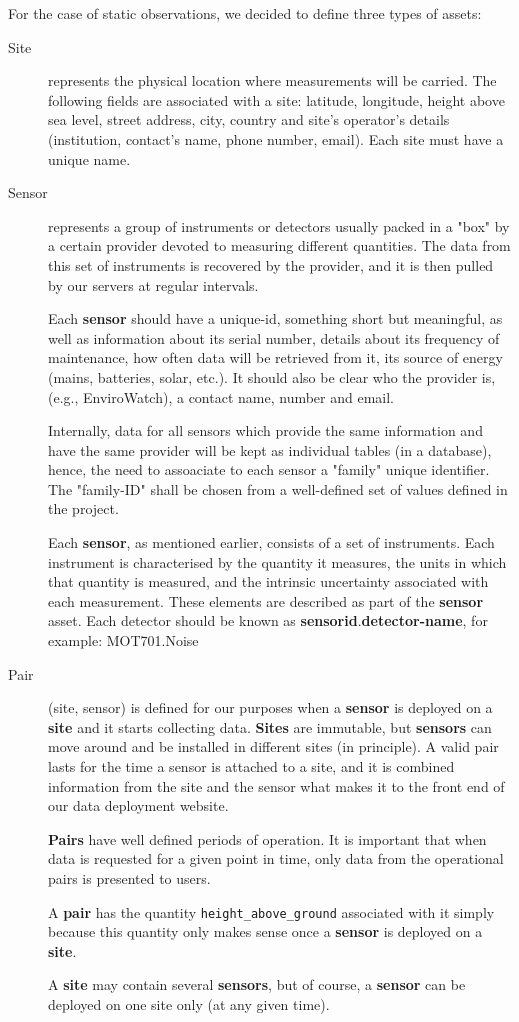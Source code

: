 \documentclass[12pt]{amsart}
\begin{document}
For the case of static observations, we decided to define three types of assets:
\begin{description}
\item[Site] represents the physical location where measurements will be carried. The following fields are associated with a site: latitude, longitude, height above sea level, street address, city, country and site's operator's details (institution, contact's name, phone number, email). Each site must have a unique name.

\item[Sensor] represents a group of instruments or detectors usually packed in a "box" by a certain provider devoted to measuring different quantities. The data from this set of instruments is recovered by the provider, and it is then pulled by our servers at regular intervals. 

Each {\bf sensor} should have a unique-id, something short but meaningful, as well as information about its serial number, details about its frequency of maintenance, how often data will be retrieved from it, its source of energy (mains, batteries, solar, etc.). It should also be clear who the provider is, (e.g., EnviroWatch), a contact name, number and email.

Internally, data for all sensors which provide the same information and have the same provider will be kept as individual tables (in a database), hence, the need to assoaciate to each sensor a "family" unique identifier. The "family-ID" shall be chosen from a well-defined set of values defined in the project.

Each {\bf sensor}, as mentioned earlier, consists of a set of instruments. Each instrument is characterised by the quantity it measures, the units in which that quantity is measured, and the intrinsic uncertainty associated with each measurement.  These elements are described as part of the {\bf sensor} asset.  Each detector should be known as {\bf sensorid}.{\bf detector-name},  for example: MOT701.Noise

\item[Pair] (site, sensor) is defined for our purposes when a {\bf sensor} is deployed on a {\bf site} and it starts collecting data.    {\bf Sites} are immutable, but {\bf sensors} can move around and be installed in different sites (in principle).   A valid pair lasts for the time a sensor is attached to a site, and it is combined information from the site and the sensor what makes it to the front end of our data deployment website. 

{\bf Pairs}  have well defined periods of operation. It is important that when data is requested for a given point in time, only data from the operational pairs is presented to users.

A {\bf pair} has the quantity {\tt height\_above\_ground} associated with it simply because this quantity only makes sense once a {\bf sensor} is deployed on a {\bf site}.

A {\bf site} may contain several {\bf sensors}, but of course, a {\bf sensor} can be deployed on one site only (at any given time).

\end{description}
\end{document}
